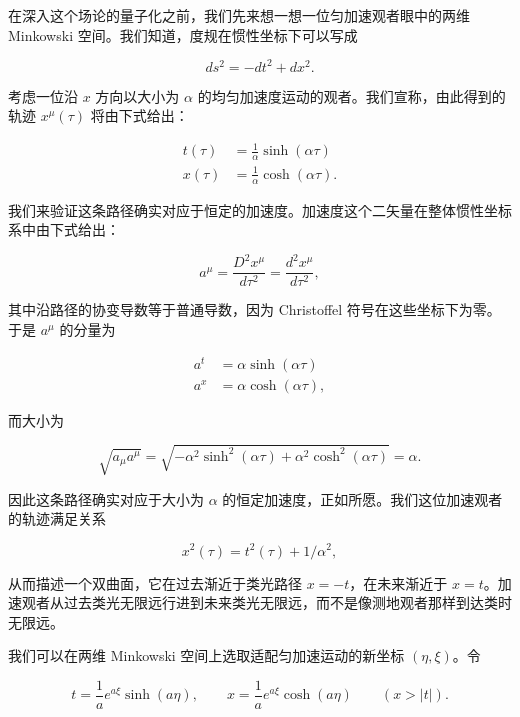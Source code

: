 在深入这个场论的量子化之前，我们先来想一想一位匀加速观者眼中的两维 Minkowski 空间。我们知道，度规在惯性坐标下可以写成

\begin{equation*}
ds^2 = -dt^2 + dx^2.
\tag{9.125}
\end{equation*}

考虑一位沿 $x$ 方向以大小为 $\alpha$ 的均匀加速度运动的观者。我们宣称，由此得到的轨迹 $x^{\mu}(\tau)$ 将由下式给出：

\begin{align*}
t(\tau) &= \frac{1}{\alpha}\sinh(\alpha\tau) \\
x(\tau) &= \frac{1}{\alpha}\cosh(\alpha\tau).
\tag{9.126}
\end{align*}

我们来验证这条路径确实对应于恒定的加速度。加速度这个二矢量在整体惯性坐标系中由下式给出：

\begin{equation*}
a^{\mu} = \frac{D^2 x^{\mu}}{d\tau^2} = \frac{d^2 x^{\mu}}{d\tau^2},
\tag{9.127}
\end{equation*}

其中沿路径的协变导数等于普通导数，因为 Christoffel 符号在这些坐标下为零。于是 $a^{\mu}$ 的分量为

\begin{align*}
a^t &= \alpha\sinh(\alpha\tau) \\
a^x &= \alpha\cosh(\alpha\tau),
\tag{9.128}
\end{align*}

而大小为

\begin{equation*}
\sqrt{a_{\mu}a^{\mu}} = \sqrt{-\alpha^{2}\sinh^{2}(\alpha\tau) + \alpha^{2}\cosh^{2}(\alpha\tau)} = \alpha.
\tag{9.129}
\end{equation*}

因此这条路径确实对应于大小为 $\alpha$ 的恒定加速度，正如所愿。我们这位加速观者的轨迹满足关系

\begin{equation*}
x^2(\tau) = t^2(\tau) + 1/\alpha^2,
\tag{9.130}
\end{equation*}

从而描述一个双曲面，它在过去渐近于类光路径 $x=-t$，在未来渐近于 $x=t$。加速观者从过去类光无限远行进到未来类光无限远，而不是像测地观者那样到达类时无限远。

我们可以在两维 Minkowski 空间上选取适配匀加速运动的新坐标 $(\eta,\xi)$。令

\begin{equation*}
t = \frac{1}{a}e^{a\xi}\sinh(a\eta), \qquad x = \frac{1}{a}e^{a\xi}\cosh(a\eta) \qquad (x > |t|).
\tag{9.131}
\end{equation*}

